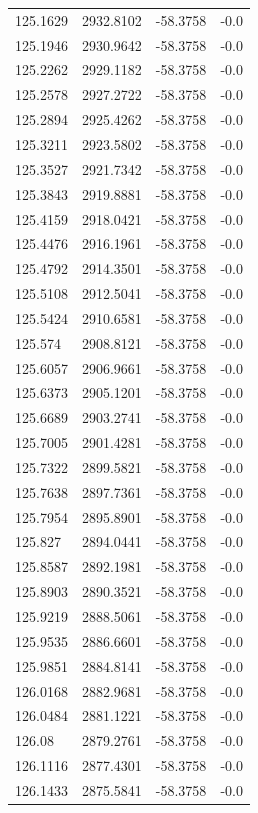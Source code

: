 \begin{table}[H]
\begin{tabular}{llll}
125.1629 & 2932.8102 & -58.3758 & -0.0 \\
125.1946 & 2930.9642 & -58.3758 & -0.0 \\
125.2262 & 2929.1182 & -58.3758 & -0.0 \\
125.2578 & 2927.2722 & -58.3758 & -0.0 \\
125.2894 & 2925.4262 & -58.3758 & -0.0 \\
125.3211 & 2923.5802 & -58.3758 & -0.0 \\
125.3527 & 2921.7342 & -58.3758 & -0.0 \\
125.3843 & 2919.8881 & -58.3758 & -0.0 \\
125.4159 & 2918.0421 & -58.3758 & -0.0 \\
125.4476 & 2916.1961 & -58.3758 & -0.0 \\
125.4792 & 2914.3501 & -58.3758 & -0.0 \\
125.5108 & 2912.5041 & -58.3758 & -0.0 \\
125.5424 & 2910.6581 & -58.3758 & -0.0 \\
125.574 & 2908.8121 & -58.3758 & -0.0 \\
125.6057 & 2906.9661 & -58.3758 & -0.0 \\
125.6373 & 2905.1201 & -58.3758 & -0.0 \\
125.6689 & 2903.2741 & -58.3758 & -0.0 \\
125.7005 & 2901.4281 & -58.3758 & -0.0 \\
125.7322 & 2899.5821 & -58.3758 & -0.0 \\
125.7638 & 2897.7361 & -58.3758 & -0.0 \\
125.7954 & 2895.8901 & -58.3758 & -0.0 \\
125.827 & 2894.0441 & -58.3758 & -0.0 \\
125.8587 & 2892.1981 & -58.3758 & -0.0 \\
125.8903 & 2890.3521 & -58.3758 & -0.0 \\
125.9219 & 2888.5061 & -58.3758 & -0.0 \\
125.9535 & 2886.6601 & -58.3758 & -0.0 \\
125.9851 & 2884.8141 & -58.3758 & -0.0 \\
126.0168 & 2882.9681 & -58.3758 & -0.0 \\
126.0484 & 2881.1221 & -58.3758 & -0.0 \\
126.08 & 2879.2761 & -58.3758 & -0.0 \\
126.1116 & 2877.4301 & -58.3758 & -0.0 \\
126.1433 & 2875.5841 & -58.3758 & -0.0 \\

\end{tabular}
\end{table}
